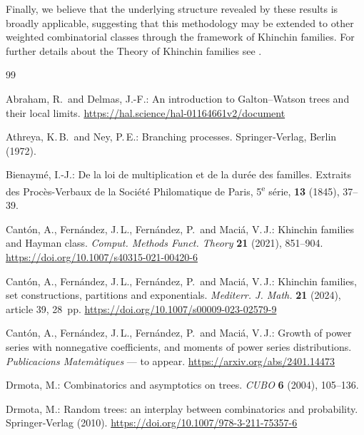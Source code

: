 \documentclass[11pt,a4paper,leqno]{amsart}
\theoremstyle{plain}
\theoremstyle{definition}
\numberwithin{equation}{section}
\begin{document}
	Finally, we believe that the underlying structure revealed by these results is broadly applicable, suggesting that this methodology may be extended to other weighted combinatorial classes through the framework of Khinchin families.
	For further details about the Theory of Khinchin families see \cite{CFFM1,CFFM2, CFFM3, K_dos, MaciaThesis, MaciaGaussian}. 
	
	
	\begin{thebibliography}{99}
		
		Abraham, R.\ and Delmas, J.-F.: 
		An introduction to Galton–Watson trees and their local limits.  
		\url{https://hal.science/hal-01164661v2/document}
		
		Athreya, K.\,B.\ and Ney, P.\,E.: 
		Branching processes.  
		Springer‑Verlag, Berlin (1972).
		
	Bienaym\'e, I.-J.: 
	De la loi de multiplication et de la dur\'ee des familles.  
	Extraits des Proc\`es-Verbaux de la Soci\'et\'e Philomatique de Paris, 5\textsuperscript{e} s\'erie, \textbf{13} (1845), 37–39. 
		
		
		Cantón, A., Fernández, J.\,L., Fernández, P.\ and Maciá, V.\,J.: 
		Khinchin families and Hayman class.  
		\emph{Comput. Methods Funct. Theory} \textbf{21} (2021), 851–904.  
		\url{https://doi.org/10.1007/s40315-021-00420-6}
		
		Cantón, A., Fernández, J.\,L., Fernández, P.\ and Maciá, V.\,J.: 
		Khinchin families, set constructions, partitions and exponentials.  
		\emph{Mediterr. J. Math.} \textbf{21} (2024), article 39, 28~pp.  
		\url{https://doi.org/10.1007/s00009-023-02579-9}
		
		Cantón, A., Fernández, J.\,L., Fernández, P.\ and Maciá, V.\,J.: 
		Growth of power series with nonnegative coefficients, and moments of power series distributions.  
		\emph{Publicacions Matemàtiques} — to appear.  
		\url{https://arxiv.org/abs/2401.14473}
		
		
		Drmota, M.: 
		Combinatorics and asymptotics on trees.  
		\emph{CUBO} \textbf{6} (2004), 105–136.
		
		Drmota, M.: 
		Random trees: an interplay between combinatorics and probability.  
		Springer‑Verlag (2010).  
		\url{https://doi.org/10.1007/978-3-211-75357-6}
		

\end{thebibliography}
\end{document}
